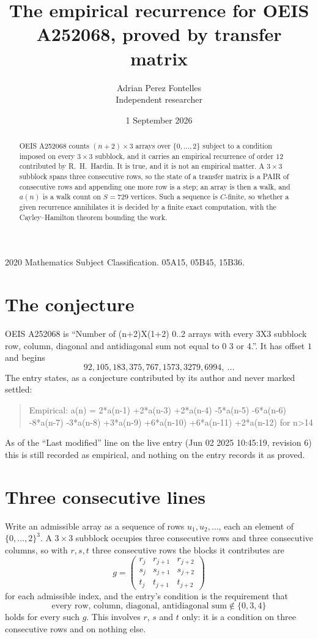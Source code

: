\documentclass[11pt,a4paper]{article}
\title{The empirical recurrence for OEIS A252068, proved by transfer matrix}
\author{Adrian Perez Fontelles\\ \small Independent researcher}
\date{1 September 2026}
\theoremstyle{plain}
\theoremstyle{definition}
\begin{document}
\maketitle

\begin{abstract}
OEIS A252068 counts $(n+2)\times3$ arrays over $\{0,\dots,2\}$ subject to a condition imposed on
every $3\times3$ subblock, and it carries an empirical recurrence of order $12$
contributed by R.~H.~Hardin. It is true, and it is not an empirical matter. A $3\times3$
subblock spans three consecutive rows, so the state of a transfer matrix is a PAIR of
consecutive rows and appending one more row is a step; an array is then a walk, and
$a(n)$ is a walk count on $S=729$ vertices. Such a sequence is $C$-finite, so whether a given
recurrence annihilates it is decided by a finite exact computation, with the Cayley--Hamilton
theorem bounding the work.
\end{abstract}

\noindent\small 2020 Mathematics Subject Classification. 05A15, 05B45, 15B36.\normalsize

\section{The conjecture}

OEIS A252068 is ``Number of (n+2)X(1+2) 0..2 arrays with every 3X3 subblock row, column, diagonal and antidiagonal sum not equal to 0 3 or 4.''. It has offset $1$ and begins
\[
92, 105, 183, 375, 767, 1573, 3279, 6994,\ \dots
\]
The entry states, as a conjecture contributed by its author and never marked settled:
\begin{quote}
Empirical: a(n) = 2*a(n-1) +2*a(n-3) +2*a(n-4) -5*a(n-5) -6*a(n-6) -8*a(n-7) -3*a(n-8) +3*a(n-9) +6*a(n-10) +6*a(n-11) +2*a(n-12) for n>14
\end{quote}
As of the ``Last modified'' line on the live entry (Jun 02 2025 10:45:19, revision 6) this is still
recorded as empirical, and nothing on the entry records it as proved.

\section{Three consecutive lines}

Write an admissible array as a sequence of rows $u_1,u_2,\dots$, each an element of
$\{0,\dots,2\}^{3}$. A $3\times3$ subblock occupies three consecutive rows and
three consecutive columns, so with $r,s,t$ three consecutive rows the blocks it
contributes are
\[
g=\begin{pmatrix}r_j&r_{j+1}&r_{j+2}\\ s_j&s_{j+1}&s_{j+2}\\ t_j&t_{j+1}&t_{j+2}\end{pmatrix}
\]
for each admissible index, and the entry's condition is the requirement that
\[
\text{every row, column, diagonal, antidiagonal sum} \notin \{0,3,4\}
\]
holds for every such $g$. This involves $r$, $s$ and $t$ only: it is a condition on
three consecutive rows and on nothing else.
\end{document}
